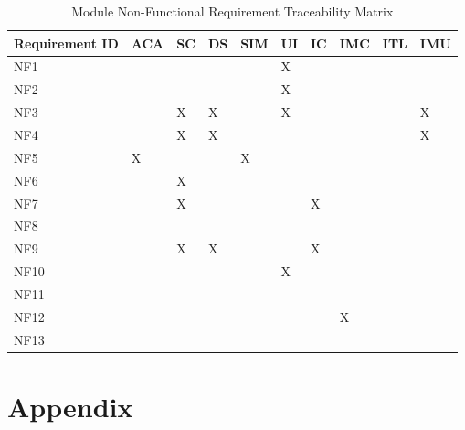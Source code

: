 \documentclass[11pt]{article}
\begin{document}
\begin{table}[H]
\centering
\caption{Module Non-Functional Requirement Traceability Matrix}
\label{my-label}
\begin{tabular}{|l|l|l|l|l|l|l|l|l|l|}
\hline
Requirement ID  & ACA & SC & DS & SIM & UI & IC & IMC & ITL & IMU  \\ \hline
NF1             &     &    &    &     &  X &    &     &     &      \\ \hline
NF2             &     &    &    &     &  X &    &     &     &      \\ \hline
NF3             &     &  X &  X &     &  X &    &     &     &  X   \\ \hline
NF4             &     &  X &  X &     &    &    &     &     &  X   \\ \hline
NF5             &  X  &    &    &  X  &    &    &     &     &      \\ \hline
NF6             &     &  X &    &     &    &    &     &     &      \\ \hline
NF7             &     &  X &    &     &    &  X &     &     &      \\ \hline
NF8             &     &    &    &     &    &    &     &     &      \\ \hline
NF9             &     &  X &  X &     &    &  X &     &     &      \\ \hline
NF10            &     &    &    &     &  X &    &     &     &      \\ \hline
NF11            &     &    &    &     &    &    &     &     &      \\ \hline
NF12            &     &    &    &     &    &    &  X  &     &      \\ \hline
NF13            &     &    &    &     &    &    &     &     &      \\ \hline
\end{tabular}
\end{table}
\newpage
\section{Appendix}
\end{document}
